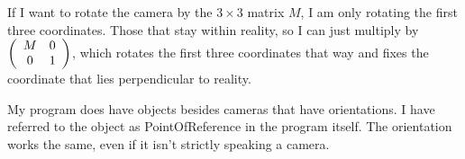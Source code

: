 If I want to rotate the camera by the $3 \times 3$ matrix $M$, I am only rotating the first three coordinates. Those that stay within reality, so I can just multiply by $\left(\begin{array}{ccc} M & 0 \\0 & 1 \end{array} \right)$, which rotates the first three coordinates that way and fixes the coordinate that lies perpendicular to reality.


My program does have objects besides cameras that have orientations. I have referred to the object as PointOfReference in the program itself. The orientation works the same, even if it isn't strictly speaking a camera.
